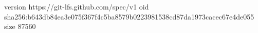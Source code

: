version https://git-lfs.github.com/spec/v1
oid sha256:b643db84ea3e075f367f4c5ba8579b0223981538cd87da1973cacec67e4de055
size 87560
